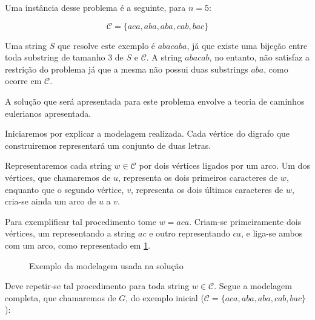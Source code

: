 \documentclass[12pt, a4paper]{article}
\begin{document}
        Uma instância desse problema é a seguinte, para $n=5$:

        \[\mathcal{C} = \{aca, aba, aba, cab, bac\}\]

        Uma string $S$ que resolve este exemplo é $abacaba$, já que existe uma bijeção entre toda substring de tamanho 3 de $S$ e $\mathcal{C}$.
        A string $abacab$, no entanto, não satisfaz a restrição do problema já que a mesma não possui duas substrings $aba$, como ocorre em $\mathcal{C}$.

        A solução que será apresentada para este problema envolve a teoria de caminhos eulerianos apresentada.

        Iniciaremos por explicar a modelagem realizada. Cada vértice do digrafo que construiremos representará um conjunto de duas letras. 
        
        Representaremos cada string $w \in \mathcal{C}$ por dois vértices ligados por um arco. Um dos vértices, que chamaremos de $u$, representa os dois primeiros caracteres de $w$, enquanto que o segundo vértice, $v$, representa os dois últimos caracteres de $w$, cria-se ainda um arco de $u$ a $v$.

        Para exemplificar tal procedimento tome $w = aca$. Criam-se primeiramente dois vértices, um representando a string $ac$ e outro representando $ca$, e liga-se ambos com um arco, como representado em \ref{fig:tanya}.

        \begin{figure}[H]
            \centering

            \caption{Exemplo da modelagem usada na solução}
            \label{fig:tanya}
        \end{figure}

        \sloppy Deve repetir-se tal procedimento para toda string $w \in \mathcal{C}$. Segue a modelagem completa, que chamaremos de $G$, do exemplo inicial ($\mathcal{C} = \{aca, aba, aba, cab, bac\}$):
       
\end{document}
